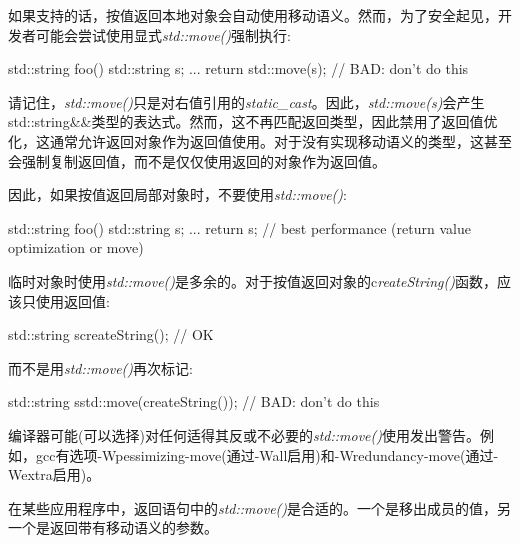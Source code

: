 如果支持的话，按值返回本地对象会自动使用移动语义。然而，为了安全起见，开发者可能会尝试使用显式\textit{std::move()}强制执行:

\begin{cppcode}
std::string foo()
{
	std::string s;
	...
	return std::move(s); // BAD: don’t do this
}
\end{cppcode}

请记住，\textit{std::move()}只是对右值引用的\textit{static_cast}。因此，\textit{std::move(s)}会产生std::string\&\&类型的表达式。然而，这不再匹配返回类型，因此禁用了返回值优化，这通常允许返回对象作为返回值使用。对于没有实现移动语义的类型，这甚至会强制复制返回值，而不是仅仅使用返回的对象作为返回值。

因此，如果按值返回局部对象时，不要使用\textit{std::move()}:

\begin{cppcode}
std::string foo()
{
	std::string s;
	...
	return s; // best performance (return value optimization or move)
}
\end{cppcode}

临时对象时使用\textit{std::move()}是多余的。对于按值返回对象的c\textit{reateString()}函数，应该只使用返回值:

\begin{cppcode}
std::string s{createString()}; // OK
\end{cppcode}

而不是用\textit{std::move()}再次标记:

\begin{cppcode}
std::string s{std::move(createString())}; // BAD: don’t do this
\end{cppcode}

编译器可能(可以选择)对任何适得其反或不必要的\textit{std::move()}使用发出警告。例如，gcc有选项-Wpessimizing-move(通过-Wall启用)和-Wredundancy-move(通过-Wextra启用)。

在某些应用程序中，返回语句中的\textit{std::move()}是合适的。一个是移出成员的值，另一个是返回带有移动语义的参数。
















